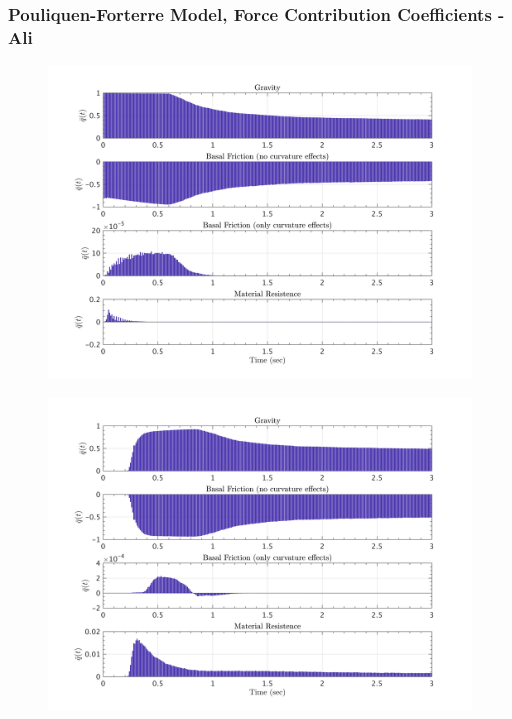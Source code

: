 \documentclass{article}
\begin{document}
\subsubsection{Pouliquen-Forterre Model, Force  Contribution Coefficients - Ali}
\begin{figure}[H]
        \begin{minipage}[b]{0.5\linewidth}
                \centering
                \includegraphics[width=1\textwidth]{InclinedPlane/LocalRecords/ContribF1_P_x.png}
                \label{fig:Ramp-Px1}
        \end{minipage}
        \begin{minipage}[b]{0.5\linewidth}
                \centering
                \includegraphics[width=1\textwidth]{InclinedPlane/LocalRecords/ContribF8_P_x.png}
                \label{fig:Ramp-Px2}
        \end{minipage}


\end{figure}
\end{document}
